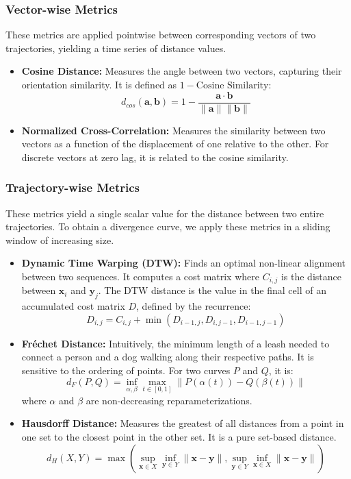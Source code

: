 \documentclass[a4paper,12pt]{article}
\begin{document}
\subsubsection{Vector-wise Metrics}
These metrics are applied pointwise between corresponding vectors of two trajectories, yielding a time series of distance values.
\begin{itemize}
    \item \textbf{Cosine Distance:} Measures the angle between two vectors, capturing their orientation similarity. It is defined as $1 - \text{Cosine Similarity}$:
    \begin{equation}
        d_{cos}(\mathbf{a}, \mathbf{b}) = 1 - \frac{\mathbf{a} \cdot \mathbf{b}}{\|\mathbf{a}\| \|\mathbf{b}\|}
    \end{equation}
    \item \textbf{Normalized Cross-Correlation:} Measures the similarity between two vectors as a function of the displacement of one relative to the other. For discrete vectors at zero lag, it is related to the cosine similarity.
\end{itemize}

\subsubsection{Trajectory-wise Metrics}
These metrics yield a single scalar value for the distance between two entire trajectories. To obtain a divergence curve, we apply these metrics in a sliding window of increasing size.
\begin{itemize}
    \item \textbf{Dynamic Time Warping (DTW):} Finds an optimal non-linear alignment between two sequences. It computes a cost matrix where $C_{i,j}$ is the distance between $\mathbf{x}_i$ and $\mathbf{y}_j$. The DTW distance is the value in the final cell of an accumulated cost matrix $D$, defined by the recurrence:
    \begin{equation}
        D_{i,j} = C_{i,j} + \min(D_{i-1, j}, D_{i, j-1}, D_{i-1, j-1})
    \end{equation}
    \item \textbf{Fréchet Distance:} Intuitively, the minimum length of a leash needed to connect a person and a dog walking along their respective paths. It is sensitive to the ordering of points. For two curves $P$ and $Q$, it is:
    \begin{equation}
        d_F(P, Q) = \inf_{\alpha, \beta} \max_{t \in [0,1]} \| P(\alpha(t)) - Q(\beta(t)) \|
    \end{equation}
    where $\alpha$ and $\beta$ are non-decreasing reparameterizations.
    \item \textbf{Hausdorff Distance:} Measures the greatest of all distances from a point in one set to the closest point in the other set. It is a pure set-based distance.
    \begin{equation}
        d_H(X, Y) = \max \left( \sup_{\mathbf{x} \in X} \inf_{\mathbf{y} \in Y} \|\mathbf{x}-\mathbf{y}\|, \sup_{\mathbf{y} \in Y} \inf_{\mathbf{x} \in X} \|\mathbf{x}-\mathbf{y}\| \right)
    \end{equation}
\end{itemize}
\end{document}
